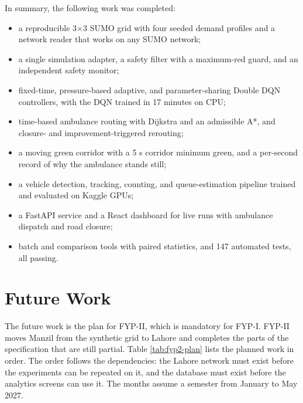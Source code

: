 In summary, the following work was completed:
\begin{itemize}[itemsep=0pt]
\item a reproducible 3$\times$3 SUMO grid with four seeded demand profiles and a network reader that works on any SUMO network;
\item a single simulation adapter, a safety filter with a maximum-red guard, and an independent safety monitor;
\item fixed-time, pressure-based adaptive, and parameter-sharing Double DQN controllers, with the DQN trained in 17 minutes on CPU;
\item time-based ambulance routing with Dijkstra and an admissible A*, and closure- and improvement-triggered rerouting;
\item a moving green corridor with a 5 s corridor minimum green, and a per-second record of why the ambulance stands still;
\item a vehicle detection, tracking, counting, and queue-estimation pipeline trained and evaluated on Kaggle GPUs;
\item a FastAPI service and a React dashboard for live runs with ambulance dispatch and road closure;
\item batch and comparison tools with paired statistics, and 147 automated tests, all passing.
\end{itemize}

\section{Future Work}

The future work is the plan for FYP-II, which is mandatory for FYP-I. FYP-II moves Manzil from the synthetic grid to Lahore and completes the parts of the specification that are still partial. Table \ref{tab:fyp2-plan} lists the planned work in order. The order follows the dependencies: the Lahore network must exist before the experiments can be repeated on it, and the database must exist before the analytics screens can use it. The months assume a semester from January to May 2027.

